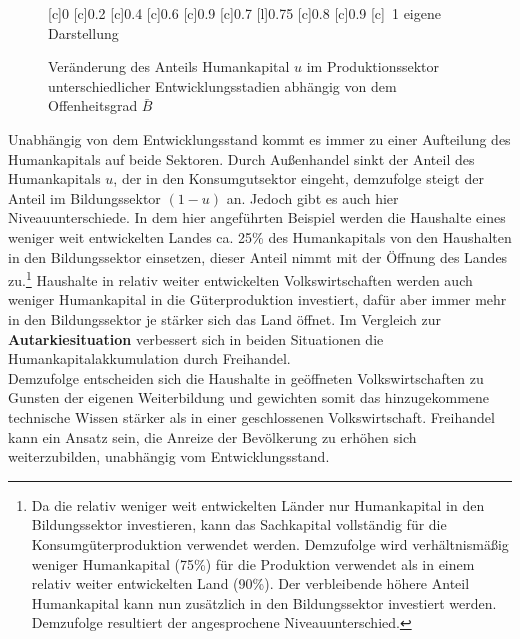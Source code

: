 %
\begin{figure}[htb] 
\vspace{0.13cm}
 \centering 
		[c]{\footnotesize{0}}
		[c]{\footnotesize{0.2}}
		[c]{\footnotesize{0.4}}
		[c]{\footnotesize{0.6}}
		[c]{\footnotesize{0.9}}
		[c]{\footnotesize{0.7}}
		[l]{\footnotesize{0.75}}
		[c]{\footnotesize{0.8}}
		[c]{\footnotesize{0.9}}
		[c]{~\footnotesize{1}}
	\hfill{}  eigene Darstellung
	\caption{Veränderung des Anteils Humankapital $u$ im Produktionssektor  unterschiedlicher Entwicklungsstadien abhängig von dem Offenheitsgrad $\bar{B}$}
	\label{fig:VergleichU}
\end{figure}
%
Unabhängig von dem Entwicklungsstand kommt es immer zu einer Aufteilung des Humankapitals auf beide Sektoren. Durch Außenhandel sinkt der Anteil des Humankapitals $u$, der in den Konsumgutsektor eingeht, demzufolge steigt der Anteil im Bildungssektor $(1-u)$ an. Jedoch gibt es auch hier Niveauunterschiede. In dem hier angeführten Beispiel werden die Haushalte eines \textcolor[rgb]{0.74,0.97,0.22}{weniger weit entwickelten Landes} ca. 25\% des Humankapitals von den Haushalten in den Bildungssektor einsetzen, dieser Anteil nimmt mit der Öffnung des Landes zu.\footnote{Da die relativ weniger weit entwickelten Länder nur Humankapital in den Bildungssektor investieren, kann das Sachkapital vollständig für die Konsumgüterproduktion verwendet werden. Demzufolge wird verhältnismäßig weniger Humankapital (75\%) für die Produktion verwendet als in einem relativ weiter entwickelten Land (90\%). Der verbleibende höhere Anteil Humankapital kann nun zusätzlich in den Bildungssektor investiert werden. Demzufolge resultiert der angesprochene Niveauunterschied.} Haushalte in \textcolor[rgb]{0,0.58,0}{relativ weiter entwickelten Volkswirtschaften} werden auch weniger Humankapital in die Güterproduktion investiert, dafür aber immer mehr in den Bildungssektor je stärker sich das Land öffnet. Im Vergleich zur \textbf{Autarkiesituation} verbessert sich in beiden Situationen die Humankapitalakkumulation durch Freihandel. \\
%
Demzufolge entscheiden sich die Haushalte in geöffneten Volkswirtschaften zu Gunsten der eigenen Weiterbildung und gewichten somit das hinzugekommene technische Wissen stärker  als in einer geschlossenen Volkswirtschaft. Freihandel kann ein Ansatz sein, die Anreize der Bevölkerung zu erhöhen sich weiterzubilden, unabhängig vom Entwicklungsstand. \\
